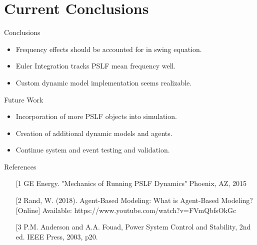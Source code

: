 \documentclass[14pt, unknownkeysallowed]{beamer}
\begin{document}
\section{Current Conclusions}
\begin{frame}
Conclusions
\begin{itemize}
	\item Frequency effects should be accounted for in swing equation.
	\item Euler Integration tracks PSLF mean frequency well.
	\item Custom dynamic model implementation seems realizable. 
\end{itemize}
\end{frame}
\begin{frame}
Future Work
\begin{itemize}
	\item Incorporation of more PSLF objects into simulation.
	\item Creation of additional dynamic models and agents.
	\item Continue system and event testing and validation.
\end{itemize}
\end{frame}
\begin{frame}
References\vspace{1em}\\
\begin{minipage}{\textwidth}
	\footnotesize
	\begin{itemize}
	\item[[1] GE Energy. "Mechanics of Running PSLF Dynamics" Phoenix, AZ, 2015
	\item[[2] Rand, W. (2018). Agent-Based Modeling: What is Agent-Based Modeling? [Online] Available: https://www.youtube.com/watch?v=FVmQbfsOkGc
	\item[[3] P.M. Anderson and A.A. Fouad, Power System Control and Stability, 2nd ed. IEEE Press, 2003, p20.
\end{itemize}
\end{minipage}
\end{frame}
\end{document}
